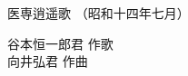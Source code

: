 \documentclass[10pt,b5j]{tarticle} %
\begin{document}
\begin{minipage}[c]{0.7\hsize} %
    \begin{center}
        {\LARGE
            医専逍遥歌 %
        }
        {\small 
            （昭和十四年七月） %
        }
    \end{center}
\end{minipage}
\begin{minipage}[c]{0.3\hsize} %
    \begin{flushright} %
        谷本恒一郎君 作歌\\向井弘君 作曲 %
    \end{flushright}
\end{minipage}
\end{document}
